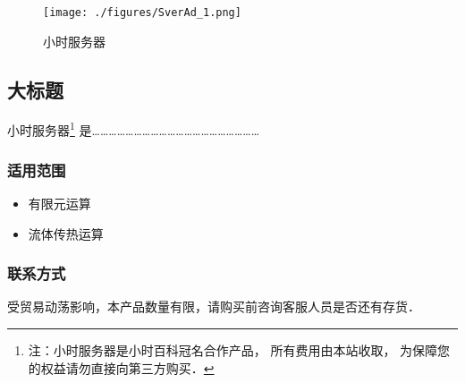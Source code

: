
\begin{issues}
\issueDraft
\end{issues}

\begin{figure}[ht]
\centering
\texttt{[image: ./figures/SverAd\_1.png]}
\caption{小时服务器}\label{SverAd_fig1}
\end{figure}

\subsection{大标题}

小时服务器\footnote{注：小时服务器是小时百科冠名合作产品， 所有费用由本站收取， 为保障您的权益请勿直接向第三方购买．} 是……………………………………………………

\subsubsection{适用范围}
\begin{itemize}
\item 有限元运算
\item 流体传热运算
\end{itemize}

\subsubsection{联系方式}

受贸易动荡影响，本产品数量有限，请购买前咨询客服人员是否还有存货．
